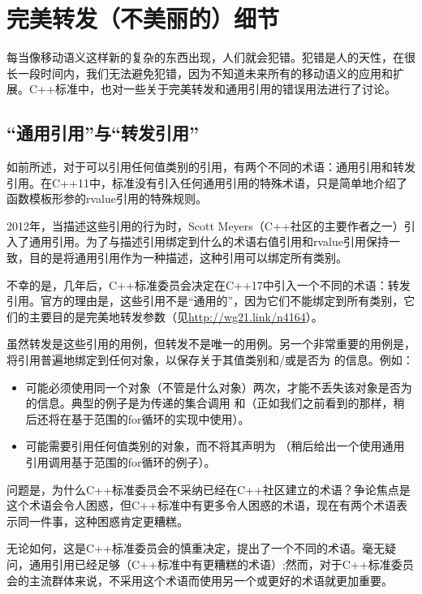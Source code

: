 \section{完美转发（不美丽的）细节}
每当像移动语义这样新的复杂的东西出现，人们就会犯错。犯错是人的天性，在很长一段时间内，我们无法避免犯错，因为不知道未来所有的移动语义的应用和扩展。C++标准中，也对一些关于完美转发和通用引用的错误用法进行了讨论。

\subsection{“通用引用”与“转发引用”}

如前所述，对于可以引用任何值类别的引用，有两个不同的术语：通用引用和转发引用。在C++11中，标准没有引入任何通用引用的特殊术语，只是简单地介绍了函数模板形参的rvalue引用的特殊规则。

2012年，当描述这些引用的行为时，Scott Meyers（C++社区的主要作者之一）引入了通用引用。为了与描述引用绑定到什么的术语右值引用和rvalue引用保持一致，目的是将通用引用作为一种描述，这种引用可以绑定所有类别。

不幸的是，几年后，C++标准委员会决定在C++17中引入一个不同的术语：转发引用。官方的理由是，这些引用不是“通用的”，因为它们不能绑定到所有类别，它们的主要目的是完美地转发参数（见\url{http://wg21.link/n4164}）。

虽然转发是这些引用的用例，但转发不是唯一的用例。另一个非常重要的用例是，将引用普遍地绑定到任何对象，以保存关于其值类别和/或是否为  的信息。例如：

\begin{itemize}
	\item 可能必须使用同一个对象（不管是什么对象）两次，才能不丢失该对象是否为  的信息。典型的例子是为传递的集合调用  和\cppinline{}（正如我们之前看到的那样，稍后还将在基于范围的for循环的实现中使用）。
	\item 可能需要引用任何值类别的对象，而不将其声明为 （稍后给出一个使用通用引用调用基于范围的for循环的例子）。
\end{itemize}

问题是，为什么C++标准委员会不采纳已经在C++社区建立的术语？争论焦点是这个术语会令人困惑，但C++标准中有更多令人困惑的术语，现在有两个术语表示同一件事，这种困惑肯定更糟糕。

无论如何，这是C++标准委员会的慎重决定，提出了一个不同的术语。毫无疑问，通用引用已经足够（C++标准中有更糟糕的术语）;然而，对于C++标准委员会的主流群体来说，不采用这个术语而使用另一个或更好的术语就更加重要。

